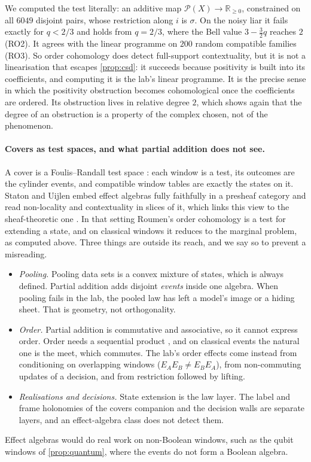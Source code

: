 \documentclass[11pt]{article}
\theoremstyle{definition}\newtheorem{definition}{Definition}\newtheorem{remark}{Remark}
\begin{document}
We computed the test literally: an additive map $\mathcal P(X)\to\mathbb R_{\ge0}$, constrained on all $6049$ disjoint pairs, whose
restriction along $i$ is $\sigma$. On the noisy liar it fails exactly for $q<2/3$ and holds from $q=2/3$, where the Bell value $3-\tfrac32q$
reaches $2$ (RO2). It agrees with the linear programme on $200$ random compatible families (RO3). So order cohomology does detect
full-support contextuality, but it is not a linearisation that escapes \cref{prop:csd}: it succeeds because positivity is built into its
coefficients, and computing it is the lab's linear programme. It is the precise sense in which the positivity obstruction becomes
cohomological once the coefficients are ordered. Its obstruction lives in relative degree $2$, which shows again that the degree of an
obstruction is a property of the complex chosen, not of the phenomenon.

\paragraph{Covers as test spaces, and what partial addition does not see.} A cover is a Foulis--Randall test space
\cite{FoulisRandall1972}: each window is a test, its outcomes are the cylinder events, and compatible window tables are exactly the
states on it. Staton and Uijlen embed effect algebras fully faithfully in a presheaf category and read non-locality and contextuality
in slices of it, which links this view to the sheaf-theoretic one \cite{StatonUijlen2015}. In that setting Roumen's order cohomology
is a test for extending a state, and on classical windows it reduces to the marginal problem, as computed above. Three things are outside
its reach, and we say so to prevent a misreading.
\begin{itemize}
\item \emph{Pooling.} Pooling data sets is a convex mixture of states, which is always defined. Partial addition adds disjoint
  \emph{events} inside one algebra. When pooling fails in the lab, the pooled law has left a model's image or a hiding sheet. That is
  geometry, not orthogonality.
\item \emph{Order.} Partial addition is commutative and associative, so it cannot express order. Order needs a sequential product
  \cite{GudderGreechie2002}, and on classical events the natural one is the meet, which commutes. The lab's order effects come instead
  from conditioning on overlapping windows ($E_AE_B\ne E_BE_A$), from non-commuting updates of a decision, and from restriction followed
  by lifting.
\item \emph{Realisations and decisions.} State extension is the law layer. The label and frame holonomies of the covers companion
  \cite[Proposition ``the prestack of realisations'']{CoversCompanion} and the decision walls are separate layers, and an effect-algebra
  class does not detect them.
\end{itemize}
Effect algebras would do real work on non-Boolean windows, such as the qubit windows of \cref{prop:quantum}, where the events do not form a Boolean algebra.
\end{document}
